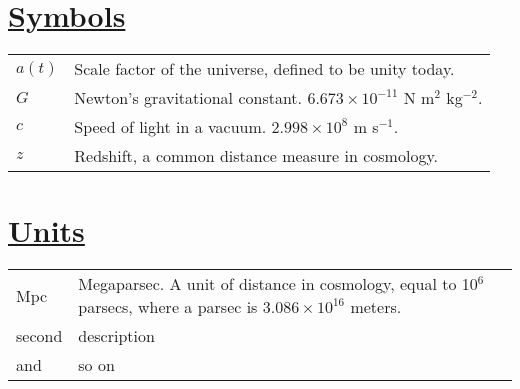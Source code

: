 
\section*{\underline{Symbols}}

\begin{tabular}{ll}
$a(t)$ & Scale factor of the universe, defined to be unity today. \\
$G$ & Newton's gravitational constant. $6.673 \times 10^{-11}$ N m$^2$ kg$^{-2}$.\\
$c$ & Speed of light in a vacuum. $2.998 \times 10^8$ m s$^{-1}$. \\
$z$ & Redshift, a common distance measure in cosmology. \\
\end{tabular}

\section*{\underline{Units}}

\begin{tabular}{ll}
Mpc & Megaparsec. A unit of distance in cosmology, equal to 10$^6$ parsecs, where a parsec is $3.086 \times 10^{16}$ meters. \\
second & description \\
and & so on \\
\end{tabular}




% 
